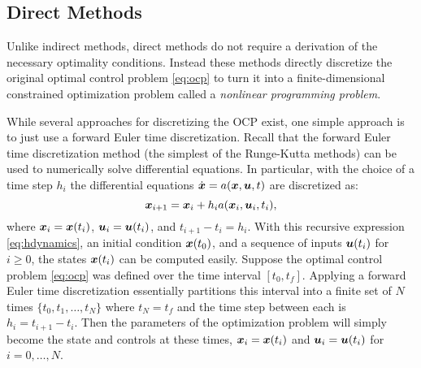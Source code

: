 \subsection{Direct Methods}
Unlike indirect methods, direct methods do not require a derivation of the necessary optimality conditions. Instead these methods directly discretize the original optimal control problem \eqref{eq:ocp} to turn it into a finite-dimensional constrained optimization problem called a \textit{nonlinear programming problem}.

While several approaches for discretizing the OCP exist, one simple approach is to just use a forward Euler time discretization. Recall that the forward Euler time discretization method (the simplest of the Runge-Kutta methods) can be used to numerically solve differential equations. In particular, with the choice of a time step $h_i$ the differential equations $\dot{\bm{x}} = a(\bm{x}, \bm{u}, t)$ are discretized as:
\begin{equation} \label{eq:hdynamics}
\bm{x}_{i+1} = \bm{x}_{i} + h_ia(\bm{x}_i, \bm{u}_i, t_i),
\end{equation}
where $\bm{x}_i = \bm{x}(t_i)$, $\bm{u}_i = \bm{u}(t_i)$, and $t_{i+1} - t_i = h_i$. With this recursive expression \eqref{eq:hdynamics}, an initial condition $\bm{x}(t_0)$, and a sequence of inputs $\bm{u}(t_i)$ for $i \geq 0$, the states $\bm{x}(t_i)$ can be computed easily.
Suppose the optimal control problem \eqref{eq:ocp} was defined over the time interval $[t_0, t_f]$. Applying a forward Euler time discretization essentially partitions this interval into a finite set of $N$ times $\{t_0, t_1, \dots, t_N\}$ where $t_N = t_f$ and the time step between each is $h_i = t_{i+1} - t_i$. Then the parameters of the optimization problem will simply become the state and controls at these times, $\bm{x}_i = \bm{x}(t_i)$ and $\bm{u}_i = \bm{u}(t_i)$ for $i = 0,\dots,N$. 

